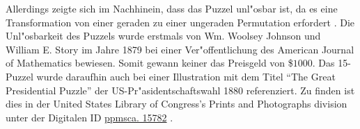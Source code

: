 Allerdings zeigte sich im Nachhinein, dass das Puzzel unl"osbar ist, da es eine Transformation von einer geraden zu einer ungeraden Permutation erfordert \autocite{wiki-15-puzzle:online}. Die Unl"osbarkeit des Puzzels wurde erstmals von Wm. Woolsey Johnson und William E. Story im Jahre 1879 bei einer Ver"offentlichung des American Journal of Mathematics bewiesen. \autocite{ajom-notes-15-puzzle:article}
Somit gewann keiner das Preisgeld von \$$1000$. Das 15-Puzzel wurde daraufhin auch bei einer Illustration mit dem Titel \enquote{The Great Presidential Puzzle} der US-Pr"asidentschaftswahl 1880 referenziert. Zu finden ist dies in der United States Library of Congress's Prints and Photographs division unter der Digitalen ID \textcolor{violet}{\href{https://www.loc.gov/rr/print/}{ppmsca. 15782}} \autocite{presidental-puzzle:online}.